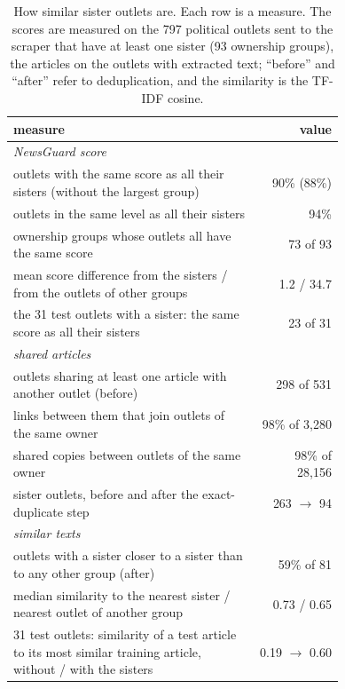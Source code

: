 \documentclass[11pt,a4paper]{article}
\begin{document}
\begin{table}[h]
\centering
\caption{How similar sister outlets are. Each row is a measure. The scores are measured on the 797 political outlets
sent to the scraper that have at least one sister (93 ownership groups), the articles on the outlets with extracted
text; ``before'' and ``after'' refer to deduplication, and the similarity is the TF-IDF cosine.}\label{tab:sisters}
\begin{tabular}{p{0.74\linewidth}r}
\toprule
measure & value \\
\midrule
\multicolumn{2}{l}{\emph{NewsGuard score}} \\
outlets with the same score as all their sisters (without the largest group) & 90\% (88\%) \\
outlets in the same level as all their sisters & 94\% \\
ownership groups whose outlets all have the same score & 73 of 93 \\
mean score difference from the sisters / from the outlets of other groups & 1.2 / 34.7 \\
the 31 test outlets with a sister: the same score as all their sisters & 23 of 31 \\
\midrule
\multicolumn{2}{l}{\emph{shared articles}} \\
outlets sharing at least one article with another outlet (before) & 298 of 531 \\
links between them that join outlets of the same owner & 98\% of 3,280 \\
shared copies between outlets of the same owner & 98\% of 28,156 \\
sister outlets, before and after the exact-duplicate step & 263 $\to$ 94 \\
\midrule
\multicolumn{2}{l}{\emph{similar texts}} \\
outlets with a sister closer to a sister than to any other group (after) & 59\% of 81 \\
median similarity to the nearest sister / nearest outlet of another group & 0.73 / 0.65 \\
31 test outlets: similarity of a test article to its most similar training article, without / with the sisters & 0.19 $\to$ 0.60 \\
\bottomrule
\end{tabular}
\end{table}
\end{document}
